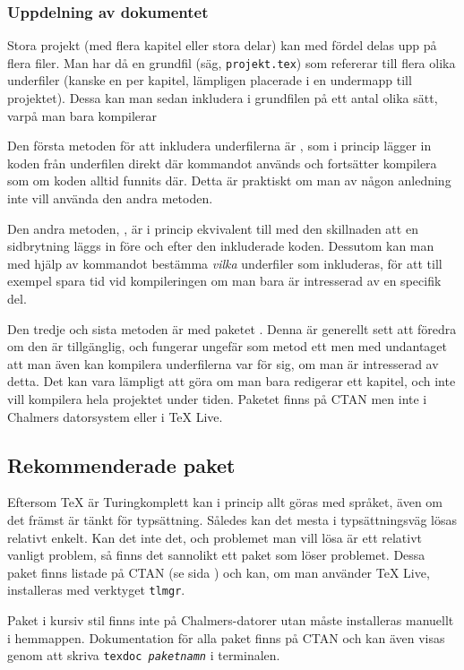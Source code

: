 \documentclass[../../latex.tex]{subfiles}
\begin{document}
\subsubsection{Uppdelning av dokumentet}
Stora projekt (med flera kapitel eller stora delar) kan med fördel delas
upp på flera filer. Man har då en grundfil (säg, \texttt{projekt.tex}) som
refererar till flera olika underfiler (kanske en per kapitel, lämpligen
placerade i en undermapp till projektet). Dessa kan man sedan inkludera
i grundfilen på ett antal olika sätt, varpå man bara kompilerar

Den första metoden för att inkludera underfilerna är , som i
princip lägger in koden från underfilen direkt där kommandot används och
fortsätter kompilera som om koden alltid funnits där. Detta är praktiskt
om man av någon anledning inte vill använda den andra metoden.

\newpage
Den andra metoden, , är i princip ekvivalent till 
med den skillnaden att en sidbrytning läggs in före och efter den 
inkluderade koden. Dessutom kan man med hjälp av kommandot
 bestämma \emph{vilka} underfiler som inkluderas, för att
till exempel spara tid vid kompileringen om man bara är intresserad av en
specifik del.

Den tredje och sista metoden är med paketet . Denna är
generellt sett att föredra om den är tillgänglig, och fungerar ungefär som
metod ett men med undantaget att man även kan kompilera underfilerna
var för sig, om man är intresserad av detta. Det kan vara lämpligt att
göra om man bara redigerar ett kapitel, och inte vill kompilera hela
projektet under tiden. Paketet  finns på CTAN men inte i
Chalmers datorsystem eller i \TeX{} Live.

\subsection{Rekommenderade paket}
Eftersom \TeX{} är Turingkomplett kan i princip allt göras med språket,
även om det främst är tänkt för typsättning. Således kan det mesta i 
typsättningsväg lösas relativt enkelt. Kan det inte det, och problemet
man vill lösa är ett relativt vanligt problem, så finns det sannolikt ett
paket som löser problemet. Dessa paket finns listade på CTAN (se sida
\pageref{sec:ctan}) och kan, om man använder \TeX{} Live, installeras
med verktyget \texttt{tlmgr}.

Paket i kursiv stil finns inte på Chalmers-datorer utan måste installeras
manuellt i hemmappen. Dokumentation för alla paket finns på CTAN och kan
även visas genom att skriva \texttt{texdoc \emph{paketnamn}} i terminalen.
\end{document}
